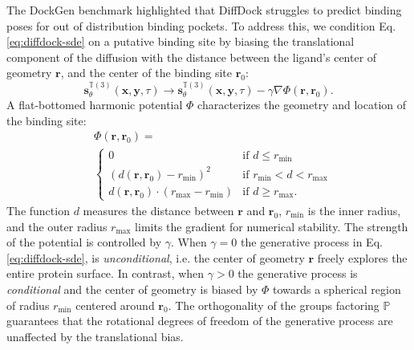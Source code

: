 \documentclass[letterpaper]{article}
\newcommand{\lh}[1]{{\color{blue}{#1}}}
\begin{document}
The DockGen benchmark highlighted that DiffDock struggles to predict binding poses for out of distribution binding pockets.\cite{corso2024dockgen} To address this, we condition Eq. \ref{eq:diffdock-sde} on a putative binding site by biasing the translational component of the diffusion with the distance between the ligand's center of geometry $\mathbf{r}$, and the center of the binding site $\mathbf{r}_0$:
\begin{equation}
    \label{eq:diffdock-sde-conditional}
        \mathbf{s}^{\mathbb{T}(3)}_\theta(\mathbf{x}, \mathbf{y}, \tau)\rightarrow \mathbf{s}^{\mathbb{T}(3)}_\theta(\mathbf{x}, \mathbf{y}, \tau) - \gamma \nabla \Phi(\mathbf{r},\mathbf{r}_0).
\end{equation}
A flat-bottomed harmonic potential $\Phi$ characterizes the geometry and location of the binding site:
\begin{equation}
    \label{eq:potential}
    \begin{aligned}
    &\Phi(\mathbf{r}, \mathbf{r}_0)  = \\
    &\begin{cases} 
    0 &\text{if } d \leq r_{\mathrm{min}} \\
    (d(\mathbf{r},\mathbf{r}_0) - r_{\mathrm{min}})^2 &\text{if } r_{\mathrm{min}} < d < r_{\mathrm{max}} \\
    d(\mathbf{r},\mathbf{r}_0)\cdot (r_{\mathrm{max}} - r_{\mathrm{min}}) &\text{if } d \geq r_{\mathrm{max}}.
    \end{cases}
    \end{aligned}
\end{equation}
The function $d$ measures the distance between $\mathbf{r}$ and $\mathbf{r}_0$, $r_{\mathrm{min}}$ is the inner radius, and the outer radius $r_{\mathrm{max}}$ limits the gradient for numerical stability. The strength of the potential is controlled by $\gamma$. When $\gamma=0$ the generative process in Eq. \ref{eq:diffdock-sde}, is {\it unconditional}, i.e. the center of geometry $\mathbf{r}$ freely explores the entire protein surface. In contrast, when $\gamma > 0$ \lh{(Eqs \ref{eq:diffdock-sde-conditional} and \ref{eq:potential})} the generative process is {\it conditional} and the center of geometry is biased by $\Phi$ towards a spherical region of radius $r_\mathrm{min}$ centered around $\mathbf{r}_0$. The orthogonality of the groups factoring $\mathbb{P}$ guarantees that the rotational degrees of freedom of the generative process are unaffected by the translational bias. \lh{An empirical sensitivity analysis confirms that increasing $\gamma$ concentrates pose sampling within the binding site (82.8\% occupancy with $\gamma=1$ vs.\ 47.9\% with $\gamma=0$ in Figure S1).}
\end{document}
